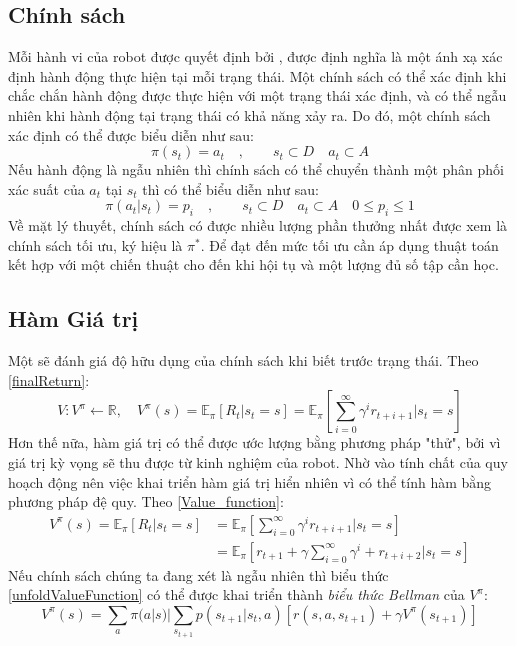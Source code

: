 \subsection{Chính sách}
Mỗi hành vi của robot được quyết định bởi , được định nghĩa là một ánh xạ xác định hành động thực hiện tại mỗi trạng thái. Một chính sách có thể xác định khi chắc chắn hành động được thực hiện với một trạng thái xác định, và có thể ngẫu nhiên khi hành động tại trạng thái có khả năng xảy ra. Do đó, một chính sách xác định có thể được biểu diễn như sau:
\begin{equation}\label{deterpolicy}
    \pi(s_t)=a_t\quad,\quad\quad s_t\subset D\quad a_t\subset A
\end{equation}
Nếu hành động là ngẫu nhiên thì chính sách có thể chuyển thành một phân phối xác suất của $a_t$ tại $s_t$ thì có thể biểu diễn như sau:
\begin{equation}\label{stochastic_policy}
\pi(a_t|s_t) = p_i\quad,\quad\quad s_t \subset D\quad a_t\subset A \quad 0\le p_i \le 1
\end{equation}
Về mặt lý thuyết, chính sách có được nhiều lượng phần thưởng nhất được xem là chính sách tối ưu, ký hiệu là $\pi^*$. Để đạt đến mức tối ưu cần áp dụng thuật toán kết hợp với một chiến thuật cho đến khi hội tụ và một lượng đủ số tập cần học. 
\subsection{Hàm Giá trị}
Một  sẽ đánh giá độ hữu dụng của chính sách khi biết trước trạng thái. Theo \ref{finalReturn}:
\begin{equation}\label{Value_function}
    V:V^\pi \longleftarrow \mathbb{R}, \quad V^\pi(s)=\mathbb{E}_\pi\left[R_t|s_t=s\right]=\mathbb{E}_\pi\left[\sum^\infty_{i=0}\gamma^ir_{t+i+1}\Big|s_t=s\right]
\end{equation}
Hơn thế nữa, hàm giá trị có thể được ước lượng bằng phương pháp "thử", bởi vì giá trị kỳ vọng sẽ thu được từ kinh nghiệm của robot. Nhờ vào tính chất của quy hoạch động nên việc khai triển hàm giá trị hiển nhiên vì có thể tính hàm bằng phương pháp đệ quy. Theo \ref{Value_function}:
\begin{align}
    \nonumber
    V^\pi(s) = \mathbb{E}_\pi[R_t|s_t=s] &= \mathbb{E}_\pi\left[\sum^{\infty}_{i=0}\gamma^ir_{t+i+1}\Big|s_t=s\right]\\
    &=\mathbb{E}_\pi\left[r_{t+1}+\gamma\sum^{\infty}_{i=0}\gamma^i + r_{t+i+2}\Big|s_t=s\right]\label{unfoldValueFunction}
\end{align}
Nếu chính sách chúng ta đang xét là ngẫu nhiên thì biểu thức \ref{unfoldValueFunction} có thể được khai triển thành \textit{biểu thức Bellman} của $V^\pi$\cite{RLSuttonBook}:
\begin{equation}
    V^\pi(s) = \sum_a\pi(a|s)|\sum_{s_{t+1}}p(s_{t+1}|s_t,a)\left[r(s,a,s_{t+1}) + \gamma V^\pi(s_{t+1})\right]
\end{equation}
